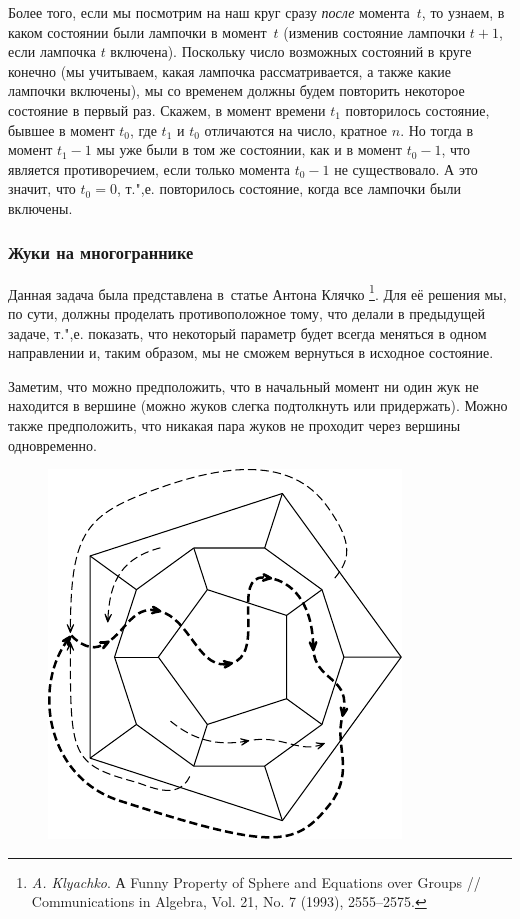 \documentclass[twoside]{book}
\begin{document}
Более того, если мы посмотрим на наш круг сразу \emph{после} момента~$t$, то узнаем, в каком состоянии были лампочки в момент~$t$ (изменив состояние лампочки $t+1$, если лампочка $t$ включена).
Поскольку число возможных состояний в круге конечно (мы учитываем, какая лампочка рассматривается, а также какие лампочки включены),  мы со временем должны будем повторить некоторое состояние в первый раз.
Скажем, в момент времени $t_1$ повторилось состояние, бывшее в момент $t_0$, где $t_1$ и $t_0$ отличаются на число, кратное $n$.
Но тогда в момент $t_1 - 1$ мы уже были в том же состоянии, как и в момент $t_0 - 1$, что является противоречием, если только момента $t_0 - 1$ не существовало.
А это значит, что $t_0=0$, т.",е. повторилось состояние, когда все лампочки были включены.
\heart

\subsubsection*{Жуки на многограннике}%

Данная задача была представлена в~статье Антона Клячко%
\footnote{\emph{A. Klyachko}. А Funny Property of Sphere and Equations over Groups /\!/ {Com\-mu\-ni\-ca\-tions in Algebra}, Vol. 21, No. 7 (1993), 2555--2575.}. 
Для её решения мы, по сути, должны проделать противоположное тому, что делали в предыдущей задаче, т.",е. показать, что некоторый параметр будет всегда меняться в одном направлении и, таким образом, мы не сможем вернуться в исходное состояние.

\medskip

Заметим, что можно предположить, что в начальный момент ни один жук не находится в вершине (можно жуков слегка подтолкнуть или придержать).
Можно также предположить, что никакая пара жуков не проходит через вершины одновременно.

\begin{figure}[!ht]
\centering
\includegraphics{mp/wink-22}
\end{figure}
\end{document}
